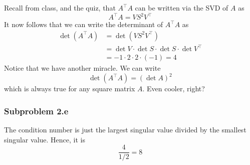 \documentclass[11pt]{article}
\begin{document}
Recall from class, and the quiz, that $A^\top A$ can be written via the SVD of $A$ as 
\[
A^\top A = V S^2 V^\top
\]
It now follows that we can write the determinant of $A^\top A$ as 
\begin{align*}
    \det\left(A^\top A\right) &= \det\left(V S^2 V^\top\right)\\
    &= \det V \cdot \det S \cdot \det S \cdot \det V^\top\\
    &= -1 \cdot 2 \cdot 2 \cdot \left(-1\right) = 4
\end{align*}
Notice that we have another miracle. We can write 
\[
\det\left(A^\top A\right) = \left(\det A\right)^2
\]
which is always true for any square matrix $A$. Even cooler, right?

\subsubsection*{Subproblem 2.e}
The condition number is just the largest singular value divided by the smallest singular value. Hence, it is 
\[
\frac{4}{1/2}=8
\]
\end{document}
